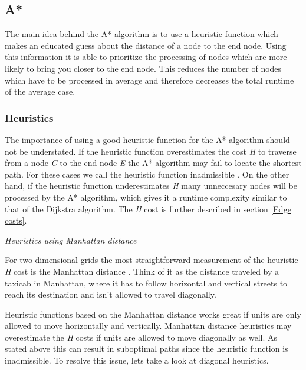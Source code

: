 \documentclass[12pt, a4paper]{article}
\begin{document}
\subsection{A*}


The main idea behind the A* algorithm is to use a heuristic function which makes
an educated guess about the distance of a node to the end node. Using this
information it is able to prioritize the processing of nodes which are more
likely to bring you closer to the end node. This reduces the number of nodes
which have to be processed in average and therefore decreases the total runtime
of the average case.


\subsubsection{Heuristics}
\label{Heuristics}

The importance of using a good heuristic function for the A* algorithm should
not be understated. If the heuristic function overestimates the cost \textit{H}
to traverse from a node \textit{C} to the end node \textit{E} the A* algorithm
may fail to locate the shortest path. For these cases we call the heuristic
function inadmissible \cite{astar2}. On the other hand, if the heuristic
function underestimates \textit{H} many unneccesary nodes will be processed by
the A* algorithm, which gives it a runtime complexity similar to that of the
Dijkstra algorithm. The \textit{H} cost is further described in section
\ref{Edge costs}.

\textit{Heuristics using Manhattan distance}

For two-dimensional grids the most straightforward measurement of the heuristic
\textit{H} cost is the Manhattan distance \cite{manhattan}. Think of it as the
distance traveled by a taxicab in Manhattan, where it has to follow horizontal
and vertical streets to reach its destination and isn't allowed to travel
diagonally.

Heuristic functions based on the Manhattan distance works great if units are
only allowed to move horizontally and vertically. Manhattan distance heuristics
may overestimate the \textit{H} costs if units are allowed to move diagonally as
well. As stated above this can result in suboptimal paths since the heuristic
function is inadmissible. To resolve this issue, lets take a look at diagonal
heuristics.
\end{document}
